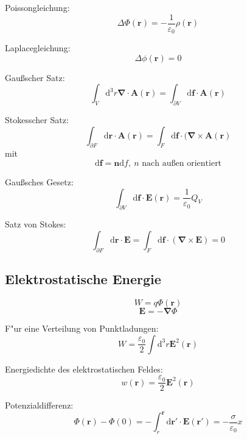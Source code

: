 \documentclass[titlepage,11pt,a4paper,ngerman]{report}
\newcommand{\dd}{\mathrm{d}}
\renewcommand{\vec}[1]{\bm{#1}}
\newcommand{\vabla}{\vec{\nabla}}
\newcommand{\vepsilon}{\varepsilon}
\begin{document}
Poissongleichung:
\[\Delta\Phi(\vec{r})=-\frac{1}{\vepsilon_0}\rho(\vec{r})\]

Laplacegleichung:
\[\Delta\phi(\vec{r})=0\]

Gau\ss scher Satz:
\[\int_V\dd^3r\vabla\cdot\vec{A}(\vec{r})=\int_{\partial V}\dd\vec{f}\cdot\vec{A}(\vec{r})\]

Stokesscher Satz:
\[\int_{\partial F}\dd\vec{r}\cdot\vec{A}(\vec{r})=\int_F\dd\vec{f}\cdot(\vabla\times\vec{A}(\vec{r})\]
mit \[\dd\vec{f}=\vec{n}\dd f,\ n\textrm{ nach au\ss en orientiert}\]

Gau\ss sches Gesetz:
\[\int_{\partial V}\dd\vec{f}\cdot\vec{E}(\vec{r})=\frac{1}{\vepsilon_0}Q_V\]

Satz von Stokes:
\[\int_{\partial F}\dd\vec{r}\cdot\vec{E}=\int_F\dd\vec{f}\cdot(\vabla\times\vec{E})=0\]

\subsection{Elektrostatische Energie}

\[W=q\Phi(\vec{r})\]
\[\vec{E}=-\vabla\Phi\]

F"ur eine Verteilung von Punktladungen:
\[W=\frac{\vepsilon_0}{2}\int\dd^3r\vec{E}^2(\vec{r})\]

Energiedichte des elektrostatischen Feldes:
\[w(\vec{r})=\frac{\vepsilon_0}{2}\vec{E}^2(\vec{r})\]

Potenzialdifferenz:
\[\Phi(\vec{r})-\Phi(0)=-\int_r^{\vec{r}}\dd\vec{r}'\cdot\vec{E}(\vec{r}')=-\frac{\sigma}{\vepsilon_0}x\]

\end{document}
